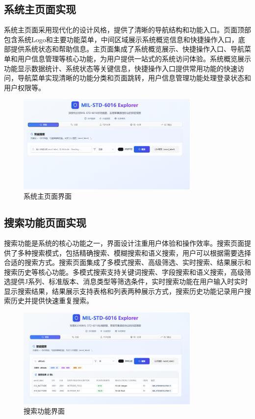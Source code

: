 \subsection{系统主页面实现}

系统主页面采用现代化的设计风格，提供了清晰的导航结构和功能入口。页面顶部包含系统Logo和主要功能菜单，中间区域展示系统概览信息和快捷操作入口，底部提供系统状态和帮助信息。主页面集成了系统概览展示、快捷操作入口、导航菜单和用户信息管理等核心功能，为用户提供一站式的系统访问体验。系统概览展示功能显示数据统计、系统状态等关键信息，快捷操作入口提供常用功能的快速访问，导航菜单实现清晰的功能分类和页面跳转，用户信息管理功能处理登录状态和用户权限等。

\begin{figure}[H]
\centering
\includegraphics[width=0.8\textwidth]{chapters/fig-0/front-homepage.png}
\caption{系统主页面界面}
\label{fig:frontend-homepage}
\end{figure}

\subsection{搜索功能页面实现}

搜索功能是系统的核心功能之一，界面设计注重用户体验和操作效率。搜索页面提供了多种搜索模式，包括精确搜索、模糊搜索和语义搜索，用户可以根据需要选择合适的搜索方式。搜索页面集成了多模式搜索、高级筛选、实时搜索、结果展示和搜索历史等核心功能。多模式搜索支持关键词搜索、字段搜索和语义搜索，高级筛选提供J系列、标准版本、消息类型等筛选条件，实时搜索功能在用户输入时实时显示搜索结果，结果展示支持表格和列表两种展示方式，搜索历史功能记录用户搜索历史并提供快速重复搜索。

\begin{figure}[H]
\centering
\includegraphics[width=0.8\textwidth]{chapters/fig-0/front-search.png}
\caption{搜索功能界面}
\label{fig:frontend-search}
\end{figure}

